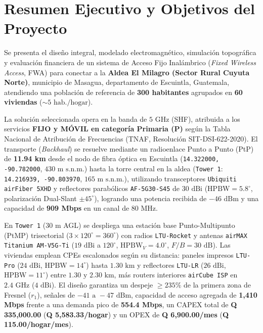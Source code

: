 \documentclass[10pt,letterpaper]{article}
\begin{document}
{
\small
\setlength{\parskip}{0.5pt}
\tableofcontents
}
\newpage
{}

\section{Resumen Ejecutivo y Objetivos del Proyecto}

Se presenta el diseño integral, modelado electromagnético, simulación topográfica y evaluación financiera de un sistema de Acceso Fijo Inalámbrico (\textit{Fixed Wireless Access}, FWA) para conectar a la \textbf{Aldea El Milagro (Sector Rural Cuyuta Norte)}, municipio de Masagua, departamento de Escuintla, Guatemala, atendiendo una población de referencia de \textbf{300 habitantes} agrupados en \textbf{60 viviendas} ($\sim 5\text{ hab./hogar}$).


La solución seleccionada opera en la banda de $5\text{ GHz}$ (SHF), atribuida a los servicios \textbf{FIJO y MÓVIL en categoría Primaria (P)} según la Tabla Nacional de Atribución de Frecuencias (TNAF, Resolución SIT-DSI-622-2020). El transporte (\textit{Backhaul}) se resuelve mediante un radioenlace Punto a Punto (PtP) de \textbf{11.94 km} desde el nodo de fibra óptica en Escuintla (\texttt{14.322000, -90.782000}, $430\text{ m s.n.m.}$) hasta la torre central en la aldea (\texttt{Tower 1}: \texttt{14.216939, -90.803970}, $165\text{ m s.n.m.}$), utilizando transceptores \texttt{Ubiquiti airFiber 5XHD} y reflectores parabólicos \texttt{AF-5G30-S45} de $30\text{ dBi}$ ($\text{HPBW} = 5.8^\circ$, polarización Dual-Slant $\pm 45^\circ$), logrando una potencia recibida de $-46\text{ dBm}$ y una capacidad de \textbf{909 Mbps} en un canal de $80\text{ MHz}$.

En \texttt{Tower 1} ($30\text{ m}$ AGL) se despliega una estación base Punto-Multipunto (PtMP) trisectorial ($3 \times 120^\circ = 360^\circ$) con radios \texttt{LTU-Rocket} y antenas \texttt{airMAX Titanium AM-V5G-Ti} ($19\text{ dBi}$ a $120^\circ$, $\text{HPBW}_V = 4.0^\circ$, $F/B = 30\text{ dB}$). Las viviendas emplean CPEs escalonados según su distancia: paneles impresos \texttt{LTU-Pro} ($24\text{ dBi}$, $\text{HPBW} = 14^\circ$) hasta $1.30\text{ km}$ y reflectores \texttt{LTU-LR} ($26\text{ dBi}$, $\text{HPBW} = 11^\circ$) entre $1.30\text{ y }2.30\text{ km}$, más routers interiores \texttt{airCube ISP} en $2.4\text{ GHz}$ ($4\text{ dBi}$). El diseño garantiza un despeje $\ge 235\%$ de la primera zona de Fresnel ($r_1$), señales de $-41\text{ a }-47\text{ dBm}$, capacidad de acceso agregada de \textbf{1,410 Mbps} frente a una demanda pico de \textbf{554.4 Mbps}, un CAPEX total de \textbf{Q 335,000.00} (\textbf{Q 5,583.33/hogar}) y un OPEX de \textbf{Q 6,900.00/mes} (\textbf{Q 115.00/hogar/mes}).
\end{document}
